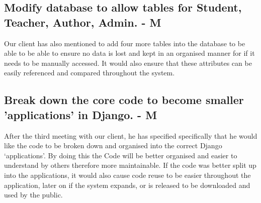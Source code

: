 \documentclass[12pt]{article}
\begin{document}
	\subsection{Modify database to allow tables for Student, Teacher, Author, Admin. - M}
	Our client has also mentioned to add four more tables into the database to be able to be able to ensure no data is lost and kept in an organised manner for if it needs to be manually accessed. It would also ensure that these attributes can be easily referenced and compared throughout the system.
	
	\subsection{Break down the core code to become smaller 'applications' in Django. - M}
	After the third meeting with our client, he has specified specifically that he would like the code to be broken down and organised into the correct Django ‘applications’. By doing this the Code will be better organised and easier to understand by others therefore more maintainable. If the code was better split up into the applications, it would also cause code reuse to be easier throughout the application, later on if the system expands, or is released to be downloaded and used by the public.
\end{document}
